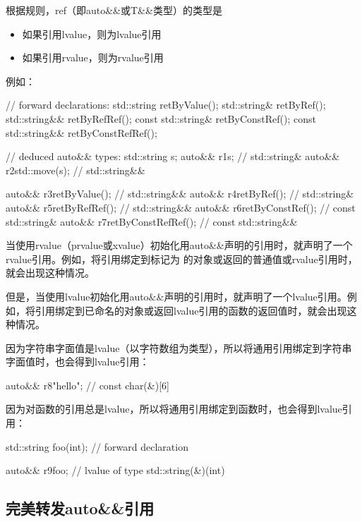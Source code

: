 根据规则，ref（即auto\&\&或T\&\&类型）的类型是

\begin{itemize}
	\item 如果引用lvalue，则为lvalue引用
	\item 如果引用rvalue，则为rvalue引用
\end{itemize}

例如：

\begin{cppcode}
// forward declarations:
std::string retByValue();
std::string& retByRef();
std::string&& retByRefRef();
const std::string& retByConstRef();
const std::string&& retByConstRefRef();

// deduced auto&& types:
std::string s;
auto&& r1{s}; // std::string&
auto&& r2{std::move(s)}; // std::string&&

auto&& r3{retByValue()}; // std::string&&
auto&& r4{retByRef()}; // std::string&
auto&& r5{retByRefRef()}; // std::string&&
auto&& r6{retByConstRef()}; // const std::string&
auto&& r7{retByConstRefRef()}; // const std::string&&
\end{cppcode}

当使用rvalue（prvalue或xvalue）初始化用auto\&\&声明的引用时，就声明了一个rvalue引用。例如，将引用绑定到标记为  的对象或返回的普通值或rvalue引用时，就会出现这种情况。

但是，当使用lvalue初始化用auto\&\&声明的引用时，就声明了一个lvalue引用。例如，将引用绑定到已命名的对象或返回lvalue引用的函数的返回值时，就会出现这种情况。

因为字符串字面值是lvalue（以字符数组为类型），所以将通用引用绑定到字符串字面值时，也会得到lvalue引用：

\begin{cppcode}
auto&& r8{"hello"}; // const char(&)[6]
\end{cppcode}

因为对函数的引用总是lvalue，所以将通用引用绑定到函数时，也会得到lvalue引用：

\begin{cppcode}
std::string foo(int); // forward declaration

auto&& r9{foo}; // lvalue of type std::string(&)(int)
\end{cppcode}

\subsection{完美转发auto\&\&引用}

